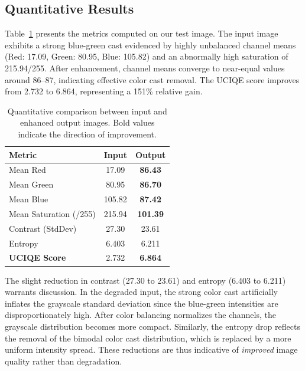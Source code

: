 \documentclass[conference]{IEEEtran}
\begin{document}
\subsection{Quantitative Results}

Table~\ref{tab:results} presents the metrics computed on our test image. The input image exhibits a strong blue-green cast evidenced by highly unbalanced channel means (Red: 17.09, Green: 80.95, Blue: 105.82) and an abnormally high saturation of 215.94/255. After enhancement, channel means converge to near-equal values around 86--87, indicating effective color cast removal. The UCIQE score improves from 2.732 to 6.864, representing a 151\% relative gain.

\begin{table}[!t]
\centering
\caption{Quantitative comparison between input and enhanced output images. Bold values indicate the direction of improvement.}
\label{tab:results}
\begin{tabular}{lcc}
\toprule
\textbf{Metric} & \textbf{Input} & \textbf{Output} \\
\midrule
Mean Red & 17.09 & \textbf{86.43} \\
Mean Green & 80.95 & \textbf{86.70} \\
Mean Blue & 105.82 & \textbf{87.42} \\
\midrule
Mean Saturation (/255) & 215.94 & \textbf{101.39} \\
Contrast (StdDev) & 27.30 & 23.61 \\
Entropy & 6.403 & 6.211 \\
\midrule
\textbf{UCIQE Score} & 2.732 & \textbf{6.864} \\
\bottomrule
\end{tabular}
\end{table}

The slight reduction in contrast (27.30 to 23.61) and entropy (6.403 to 6.211) warrants discussion. In the degraded input, the strong color cast artificially inflates the grayscale standard deviation since the blue-green intensities are disproportionately high. After color balancing normalizes the channels, the grayscale distribution becomes more compact. Similarly, the entropy drop reflects the removal of the bimodal color cast distribution, which is replaced by a more uniform intensity spread. These reductions are thus indicative of \textit{improved} image quality rather than degradation.
\end{document}
